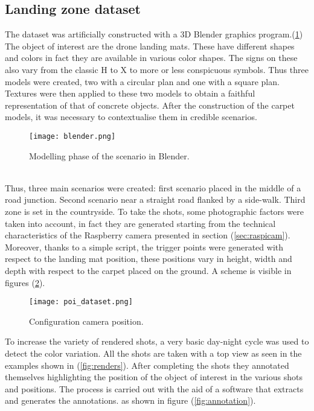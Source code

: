 \subsection{Landing zone dataset}
\label{ssec:landing-zone}
%
The dataset was artificially constructed with a 3D Blender graphics program.(\ref{fig:blender})\\ 
The object of interest are the drone landing mats. These have different shapes
and colors in fact they are available in various color shapes. The signs on
these also vary from the classic H to X to more or less conspicuous symbols.
Thus three models were created, two with a circular plan and one with a square
plan. Textures were then applied to these two models to obtain a faithful
representation of that of concrete objects. \hfill \break
After the construction of the carpet models, it was necessary to contextualise 
them in credible scenarios. \hfill \break
%
\begin{figure}[htb]
	\centering
	\texttt{[image: blender.png]}
	\caption{Modelling phase of the scenario in Blender.}
	\label{fig:blender}
\end{figure}
%
\\Thus, three main scenarios were created: first scenario placed in the middle of a road
junction. Second scenario near a straight road flanked by a side-walk.
Third zone is set in the countryside. To take the shots, some photographic
factors were taken into account, in fact they are generated starting from the
technical characteristics of the Raspberry camera presented in section
(\ref{sec:raspicam}). Moreover, thanks to a simple script, the trigger points
were generated with respect to the landing mat position, these positions vary in
height, width and depth with respect to the carpet placed on the ground.
A scheme is visible in figures (\ref{fig:poi_dataset}). \hfill \break
%
\begin{figure}[!h]
	\centering
	\texttt{[image: poi\_dataset.png]}
	\caption{Configuration camera position.}
	\label{fig:poi_dataset}
\end{figure}
%
\newpage
To increase the variety of rendered shots, a very basic day-night cycle was
used to detect the color variation. All the shots are taken with a top view as
seen in the examples shown in (\ref{fig:renders}).
After completing the shots they annotated themselves highlighting the position
of the object of interest in the various shots and positions.
The process is carried out with the aid of a software that extracts and
generates the annotations. as shown in figure (\ref{fig:annotation}).
